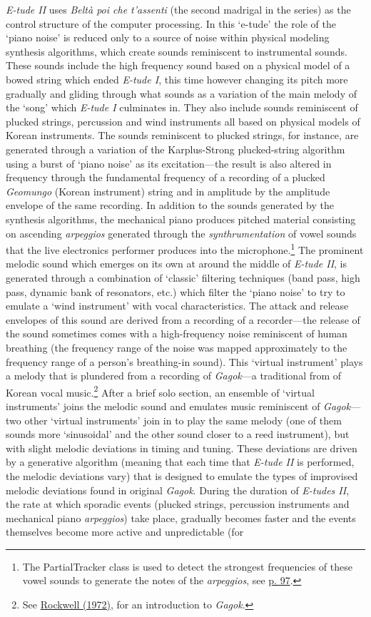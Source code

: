 \emph{E-tude II} uses \emph{Belt\`{a} poi che t'assenti} (the second madrigal in the series) as the control structure of the computer processing. In this `e-tude' the role of the `piano noise' is reduced only to a source of noise within physical modeling synthesis algorithms, which create sounds reminiscent to instrumental sounds. These sounds include the high frequency sound based on a physical model of a bowed string which ended \emph{E-tude I}, this time however changing its pitch more gradually and gliding through what sounds as a variation of the main melody of the `song' which \emph{E-tude I} culminates in. They also include sounds reminiscent of plucked strings, percussion and wind instruments all based on physical models of Korean instruments. The sounds reminiscent to plucked strings, for instance, are generated through a variation of the Karplus-Strong plucked-string algorithm using a burst of `piano noise' as its excitation---the result is also altered in frequency through the fundamental frequency of a recording of a plucked \emph{Geomungo} (Korean instrument) string and in amplitude by the amplitude envelope of the same recording. In addition to the sounds generated by the synthesis algorithms, the mechanical piano produces pitched material consisting on ascending \emph{arpeggios} generated through the \emph{synthrumentation} of vowel sounds that the live electronics performer produces into the microphone.\footnote{The PartialTracker class is used to detect the strongest frequencies of these vowel sounds to generate the notes of the \emph{arpeggios}, see \hyperlink{partrack}{p. 97}.} The prominent melodic sound which emerges on its own at around the middle of \emph{E-tude II}, is generated through a combination of `classic' filtering techniques (band pass, high pass, dynamic bank of resonators, etc.) which filter the `piano noise' to try to emulate a `wind instrument' with vocal characteristics. The attack and release envelopes of this sound are derived from a recording of a recorder---the release of the sound sometimes comes with a high-frequency noise reminiscent of human breathing (the frequency range of the noise was mapped approximately to the frequency range of a person's breathing-in sound). This `virtual instrument' plays a melody that is plundered from a recording of \emph{Gagok}---a traditional from of Korean vocal music.\footnote{See \hyperlink{rockwell}{Rockwell (1972)}, for an introduction to \emph{Gagok}.} After a brief solo section, an ensemble of `virtual instruments' joins the melodic sound and emulates music reminiscent of \emph{Gagok}---two other `virtual instruments' join in to play the same melody (one of them sounds more `sinusoidal' and the other sound closer to a reed instrument), but with slight melodic deviations in timing and tuning. These deviations are driven by a generative algorithm (meaning that each time that \emph{E-tude II} is performed, the melodic deviations vary) that is designed to emulate the types of improvised melodic deviations found in original \emph{Gagok}. During the duration of \emph{E-tudes II}, the rate at which sporadic events (plucked strings, percussion instruments and mechanical piano \emph{arpeggios}) take place, gradually becomes faster and the events themselves become more active and unpredictable (for 